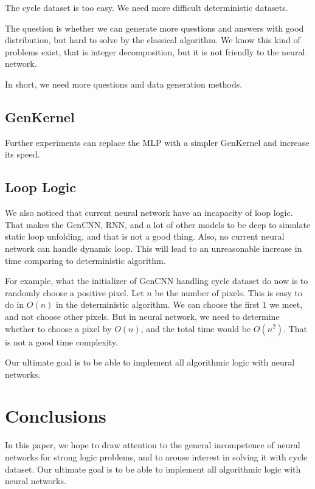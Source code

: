 \documentclass{article}
\begin{document}
The cycle dataset is too easy. We need more difficult deterministic datasets.

The question is whether we can generate more questions and answers with good distribution, 
but hard to solve by the classical algorithm. We know this kind of problems exist, 
that is integer decomposition, but it is not friendly to the neural network.

In short, we need more questions and data generation methods.

\subsection{GenKernel}

Further experiments can replace the MLP with a simpler GenKernel and increase its speed.

\subsection{Loop Logic}

We also noticed that current neural network have an incapacity of loop logic. 
That makes the GenCNN, RNN, and a lot of other models to be deep to simulate static loop unfolding, 
and that is not a good thing.
Also, no current neural network can handle dynamic loop. 
This will lead to an unreasonable increase in time comparing to deterministic algorithm.

For example, what the initializer of GenCNN handling cycle dataset do now is to randomly choose a positive pixel.
Let $n$ be the number of pixels.
This is easy to do in $O(n)$ in the deterministic algorithm. We can choose the first $1$ we meet, and not choose other pixels.
But in neural network, we need to determine whether to choose a pixel by $O(n)$, and the total time would be $O(n^2)$.
That is not a good time complexity.

Our ultimate goal is to be able to implement all algorithmic logic with neural networks.

\section{Conclusions}


In this paper, we hope to draw attention to the general incompetence of neural networks for strong logic problems, 
and to arouse interest in solving it with cycle dataset. 
Our ultimate goal is to be able to implement all algorithmic logic with neural networks.
\end{document}
